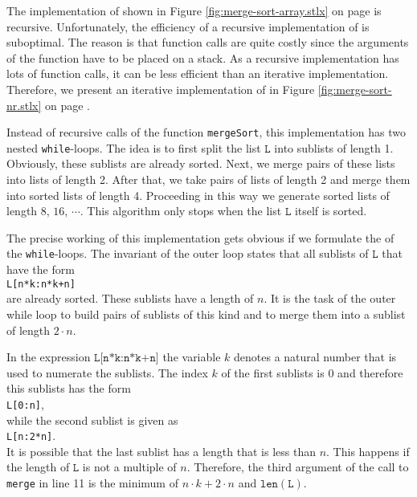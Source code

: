 \noindent
The implementation of  shown in Figure \ref{fig:merge-sort-array.stlx} on page
\pageref{fig:merge-sort-array.stlx} is recursive.  Unfortunately, the efficiency of a recursive
implementation of  is suboptimal.  The reason is that function calls are quite
costly since the arguments of the function have to be placed on a stack.  As a recursive
implementation has lots of function calls, it can be less efficient than an iterative
implementation.  Therefore, we present an iterative implementation of  in Figure
\ref{fig:merge-sort-nr.stlx} on page \pageref{fig:merge-sort-nr.stlx}.

Instead of recursive calls of the function \texttt{mergeSort}, this implementation has two nested 
\texttt{while}-loops.  The idea is to first split the list $\texttt{L}$ into sublists of length 1.
Obviously, these sublists are already sorted.  Next, we merge pairs of these lists into lists of
length 2.  After that, we take pairs of lists of length 2 and merge them into sorted lists of length
4. Proceeding in this way we generate sorted lists of length
$8$, $16$, $\cdots$.  This algorithm only stops when the list $\texttt{L}$ itself is sorted.

The precise working of this implementation gets obvious if we formulate the  of the
\texttt{while}-loops.  The invariant of the outer loop states that all sublists of $\texttt{L}$ 
that have the form
\\[0.2cm]
\hspace*{1.3cm}
\texttt{L[n*k:n*k+n]}
\\[0.2cm]
are already sorted.  These sublists have a length of $n$.  It is the task of the outer while loop to build
pairs of sublists of this kind and to merge them into a sublist of length $2 \cdot n$.

In the expression $\texttt{L[n*k:n*k+n]}$ the variable $k$ denotes a natural
number that is used to numerate the sublists.  The index $k$ of the first sublists is $0$ and
therefore this sublists has the form
\\[0.2cm]
\hspace*{1.3cm}
\texttt{L[0:n]},
\\[0.2cm]
while the second sublist is given as
\\[0.2cm]
\hspace*{1.3cm}
\texttt{L[n:2*n]}.
\\[0.2cm]
It is possible that the last sublist has a length that is less than $n$.  This happens if the length
of $\texttt{L}$ is not a multiple of $n$.  Therefore, the third argument of the call to \texttt{merge}
in line 11 is the minimum of $n\cdot k + 2\cdot n$ and $\texttt{len}(\texttt{L})$.

